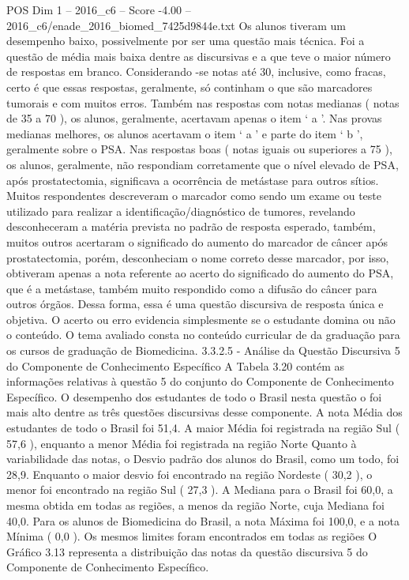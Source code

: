 \begin{textsample}{POS Dim 1 – 2016\_c6 – Score -4.00 – 2016\_c6/enade\_2016\_biomed\_7425d9844e.txt}
Os alunos tiveram um desempenho baixo, possivelmente por ser uma questão mais técnica.
Foi a questão de média mais baixa dentre as discursivas e a que teve o maior número de respostas em branco.
Considerando -se notas até 30, inclusive, como fracas, certo é que essas respostas, geralmente, só continham o que são marcadores tumorais e com muitos erros.
Também nas respostas com notas medianas ( notas de 35 a 70 ), os alunos, geralmente, acertavam apenas o item ‘ a ’.
Nas provas medianas melhores, os alunos acertavam o item ‘ a ’ e parte do item ‘ b ’, geralmente sobre o PSA.
Nas respostas boas ( notas iguais ou superiores a 75 ), os alunos, geralmente, não respondiam corretamente que o nível elevado de PSA, após prostatectomia, significava a ocorrência de metástase para outros sítios.
Muitos respondentes descreveram o marcador como sendo um exame ou teste utilizado para realizar a identificação/diagnóstico de tumores, revelando desconheceram a matéria prevista no padrão de resposta esperado, também, muitos outros acertaram o significado do aumento do marcador de câncer após prostatectomia, porém, desconheciam o nome correto desse marcador, por isso, obtiveram apenas a nota referente ao acerto do significado do aumento do PSA, que é a metástase, também muito respondido como a difusão do câncer para outros órgãos.
Dessa forma, essa é uma questão discursiva de resposta única e objetiva.
O acerto ou erro evidencia simplesmente se o estudante domina ou não o conteúdo.
O tema avaliado consta no conteúdo curricular de da graduação para os cursos de graduação de Biomedicina. 3.3.2.5 - Análise da Questão Discursiva 5 do Componente de Conhecimento Específico A Tabela 3.20 contém as informações relativas à questão 5 do conjunto do Componente de Conhecimento Específico.
O desempenho dos estudantes de todo o Brasil nesta questão o foi mais alto dentre as três questões discursivas desse componente.
A nota Média dos estudantes de todo o Brasil foi 51,4.
A maior Média foi registrada na região Sul ( 57,6 ), enquanto a menor Média foi registrada na região Norte Quanto à variabilidade das notas, o Desvio padrão dos alunos do Brasil, como um todo, foi 28,9.
Enquanto o maior desvio foi encontrado na região Nordeste ( 30,2 ), o menor foi encontrado na região Sul ( 27,3 ).
A Mediana para o Brasil foi 60,0, a mesma obtida em todas as regiões, a menos da região Norte, cuja Mediana foi 40,0.
Para os alunos de Biomedicina do Brasil, a nota Máxima foi 100,0, e a nota Mínima ( 0,0 ).
Os mesmos limites foram encontrados em todas as regiões O Gráfico 3.13 representa a distribuição das notas da questão discursiva 5 do Componente de Conhecimento Específico.

\end{textsample}
